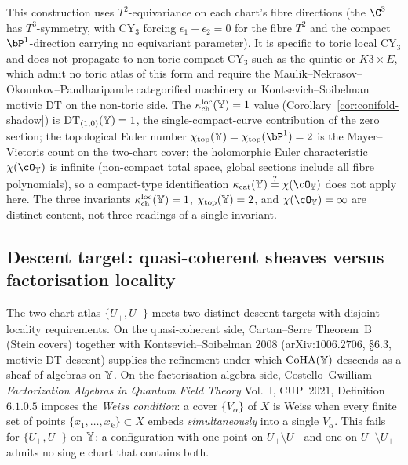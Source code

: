 \begin{remark}
\label{rem:conifold-toric-scope}
This construction uses $T^2$-equivariance on each chart's fibre directions (the $\C^3$ has $T^3$-symmetry, with CY$_3$ forcing $\epsilon_1 + \epsilon_2 = 0$ for the fibre $T^2$ and the compact $\bP^1$-direction carrying no equivariant parameter). It is specific to toric local CY$_3$ and does not propagate to non-toric compact CY$_3$ such as the quintic or $K3 \times E$, which admit no toric atlas of this form and require the Maulik--Nekrasov--Okounkov--Pandharipande categorified machinery or Kontsevich--Soibelman motivic DT on the non-toric side. The $\kappa_{\mathrm{ch}}^{\mathrm{loc}}(\mathbb{Y}) = 1$ value (Corollary~\ref{cor:conifold-shadow}) is $\mathrm{DT}_{(1,0)}(\mathbb{Y}) = 1$, the single-compact-curve contribution of the zero section; the topological Euler number $\chi_{\mathrm{top}}(\bY) = \chi_{\mathrm{top}}(\bP^1) = 2$ is the Mayer--Vietoris count on the two-chart cover; the holomorphic Euler characteristic $\chi(\cO_\bY)$ is infinite (non-compact total space, global sections include all fibre polynomials), so a compact-type identification $\kappa_{\mathrm{cat}}(\bY) \stackrel{?}{=} \chi(\cO_\bY)$ does not apply here. The three invariants $\kappa_{\mathrm{ch}}^{\mathrm{loc}}(\mathbb{Y}) = 1$, $\chi_{\mathrm{top}}(\mathbb{Y}) = 2$, and $\chi(\cO_\bY) = \infty$ are distinct content, not three readings of a single invariant.
\end{remark}

\subsection{Descent target: quasi-coherent sheaves versus factorisation locality}
\label{subsec:conifold-weiss-vs-cech}

The two-chart atlas $\{U_+, U_-\}$ meets two distinct descent targets with disjoint locality requirements. On the quasi-coherent side, Cartan--Serre Theorem~B (Stein covers) together with Kontsevich--Soibelman 2008 (arXiv:$1006.2706$, §$6.3$, motivic-DT descent) supplies the refinement under which $\mathrm{CoHA}(\mathbb{Y})$ descends as a sheaf of algebras on $\mathbb{Y}$. On the factorisation-algebra side, Costello--Gwilliam \emph{Factorization Algebras in Quantum Field Theory} Vol.~I, CUP~$2021$, Definition~$6.1.0.5$ imposes the \emph{Weiss condition}: a cover $\{V_\alpha\}$ of $X$ is Weiss when every finite set of points $\{x_1, \ldots, x_k\} \subset X$ embeds \emph{simultaneously} into a single $V_\alpha$. This fails for $\{U_+, U_-\}$ on $\mathbb{Y}$: a configuration with one point on $U_+ \setminus U_-$ and one on $U_- \setminus U_+$ admits no single chart that contains both.

